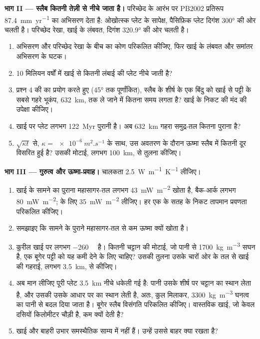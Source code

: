 \begin{problem}
\medskip
\noindent\textbf{भाग II --- स्लैब कितनी तेज़ी से नीचे जाता है।} परिच्छेद के आरंभ पर PB2002 प्रतिरूप \qty{87.4}{mm.yr^{-1}} का अभिसरण देता है: ओखोत्स्क प्लेट के सापेक्ष, पैसिफ़िक प्लेट दिगंश \ang{300} की ओर चलती है। परिच्छेद रेखा, खाई के लंबवत, दिगंश \ang{320.9} की ओर चलती है।
\begin{enumerate}[resume]
  \item अभिसरण और परिच्छेद रेखा के बीच का कोण परिकलित कीजिए, फिर खाई के लंबवत और समांतर अभिसरण के घटक।
  \item 10 मिलियन वर्षों में खाई से कितनी लंबाई की प्लेट नीचे जाती है?
  \item प्रश्न 4 की  का प्रयोग करते हुए (\ang{45} तक पूर्णांकित), स्लैब के शीर्ष के एक बिंदु को खाई से पट्टी के सबसे गहरे भूकंप, \qty{632}{km}, तक ले जाने में कितना समय लगता है? खाई के निकट की मंद  की उपेक्षा कीजिए।
  \item खाई पर प्लेट लगभग \qty{122}{Myr} पुरानी है। अब \qty{632}{km} गहरा समुद्र-तल कितना पुराना है?
  \item $\sqrt{\kappa t}$ से, $\kappa = \qty{e-6}{m^2.s^{-1}}$ के साथ, उस अवतरण के दौरान ऊष्मा स्लैब में कितनी दूर विसरित हुई है? उसकी मोटाई, लगभग \qty{100}{km}, से तुलना कीजिए।
\end{enumerate}

\medskip
\noindent\textbf{भाग III --- गुरुत्व और ऊष्मा-प्रवाह।} चालकता \qty{2.5}{W.m^{-1}.K^{-1}} लीजिए।
\begin{enumerate}[resume]
  \item खाई के सामने का पुराना महासागर-तल लगभग \qty{43}{mW.m^{-2}} खोता है, बैक-आर्क लगभग \qty{80}{mW.m^{-2}};  के लिए \qty{35}{mW.m^{-2}} लीजिए। हर एक के सतह के निकट तापमान प्रवणता परिकलित कीजिए।
  \item समझाइए कि  सामने के पुराने महासागर-तल से कम ऊष्मा क्यों खोता है।
  \item कुरील खाई पर  लगभग \qty{-260}{\milli\gal} है। कितनी चट्टान की मोटाई, जो पानी से \qty{1700}{kg.m^{-3}} सघन है, एक बूगेर पट्टी को यह कमी देने के लिए चाहिए? उसकी तुलना उसके चारों ओर के तल से खाई की गहराई, लगभग \qty{3.5}{km}, से कीजिए।
  \item अब मान लीजिए पूरी प्लेट \qty{3.5}{km} नीचे धकेली गई है: पानी उसके शीर्ष पर चट्टान का स्थान लेता है, और उसकी  उसके आधार पर  का स्थान लेती है, अतः, कुल मिलाकर, \qty{3300}{kg.m^{-3}} घनत्व का  पानी से बदल दिया जाता है। बूगेर स्लैब विसंगति परिकलित कीजिए। वास्तविक खाई, जो केवल दसियों किलोमीटर चौड़ी है, कम क्यों देती है?
  \item खाई और बाहरी उभार समस्थैतिक साम्य में नहीं हैं। उन्हें उससे बाहर क्या रखता है?
\end{enumerate}


\end{problem}
